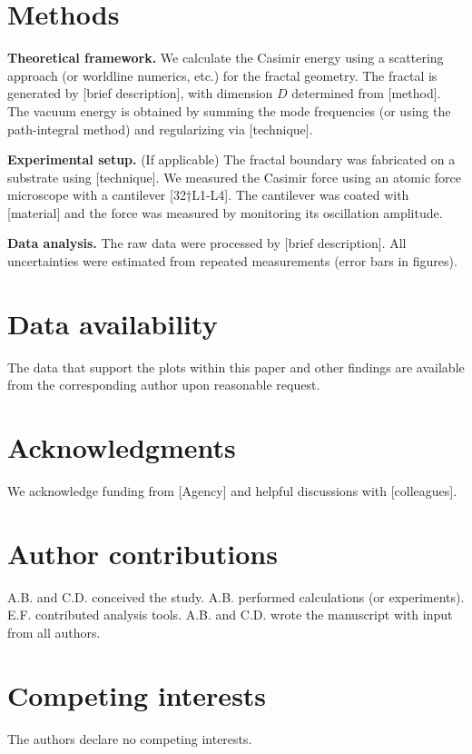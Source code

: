 \documentclass[aps,prl,10pt]{revtex4-1} %
\begin{document}
\section*{Methods}
\noindent\textbf{Theoretical framework.}  We calculate the Casimir energy using a scattering approach (or worldline numerics, etc.) for the fractal geometry.  The fractal is generated by [brief description], with dimension $D$ determined from [method].  The vacuum energy is obtained by summing the mode frequencies (or using the path-integral method) and regularizing via [technique].  %
 
\noindent\textbf{Experimental setup.}  (If applicable) The fractal boundary was fabricated on a substrate using [technique].  We measured the Casimir force using an atomic force microscope with a cantilever [32†L1-L4].  The cantilever was coated with [material] and the force was measured by monitoring its oscillation amplitude.  

\noindent\textbf{Data analysis.}  The raw data were processed by [brief description].  All uncertainties were estimated from repeated measurements (error bars in figures).  

\section*{Data availability}
The data that support the plots within this paper and other findings are available from the corresponding author upon reasonable request.

\section*{Acknowledgments}
We acknowledge funding from [Agency] and helpful discussions with [colleagues]. 

\section*{Author contributions}
A.B. and C.D. conceived the study.  A.B. performed calculations (or experiments).  E.F. contributed analysis tools.  A.B. and C.D. wrote the manuscript with input from all authors.

\section*{Competing interests}
The authors declare no competing interests.


\end{document}

